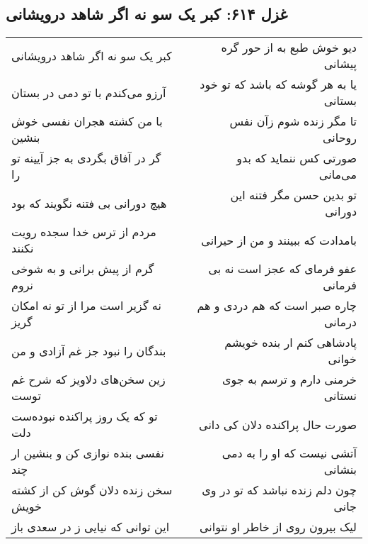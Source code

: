 \begin{center}
\section*{غزل ۶۱۴: کبر یک سو نه اگر شاهد درویشانی}
\label{sec:614}
\begin{longtable}{l p{0.5cm} r}
کبر یک سو نه اگر شاهد درویشانی
&&
دیو خوش طبع به از حور گره پیشانی
\\
آرزو می‌کندم با تو دمی در بستان
&&
یا به هر گوشه که باشد که تو خود بستانی
\\
با من کشته هجران نفسی خوش بنشین
&&
تا مگر زنده شوم زآن نفس روحانی
\\
گر در آفاق بگردی به جز آیینه تو را
&&
صورتی کس ننماید که بدو می‌مانی
\\
هیچ دورانی بی فتنه نگویند که بود
&&
تو بدین حسن مگر فتنه این دورانی
\\
مردم از ترس خدا سجده رویت نکنند
&&
بامدادت که ببینند و من از حیرانی
\\
گرم از پیش برانی و به شوخی نروم
&&
عفو فرمای که عجز است نه بی فرمانی
\\
نه گزیر است مرا از تو نه امکان گریز
&&
چاره صبر است که هم دردی و هم درمانی
\\
بندگان را نبود جز غم آزادی و من
&&
پادشاهی کنم ار بنده خویشم خوانی
\\
زین سخن‌های دلاویز که شرح غم توست
&&
خرمنی دارم و ترسم به جوی نستانی
\\
تو که یک روز پراکنده نبوده‌ست دلت
&&
صورت حال پراکنده دلان کی دانی
\\
نفسی بنده نوازی کن و بنشین ار چند
&&
آتشی نیست که او را به دمی بنشانی
\\
سخن زنده دلان گوش کن از کشته خویش
&&
چون دلم زنده نباشد که تو در وی جانی
\\
این توانی که نیایی ز در سعدی باز
&&
لیک بیرون روی از خاطر او نتوانی
\\
\end{longtable}
\end{center}
